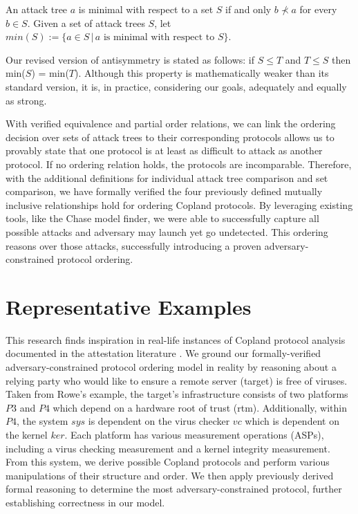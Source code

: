 \documentclass[runningheads]{llncs}
\theoremstyle{definition}
\begin{document}
\begin{definition}
  An attack tree $a$ is minimal with respect to a set $S$ if and only $b \nprec a$ for every $b \in S$. Given a set of attack trees $S$, let $min(S) := \{a \in S \,|\, a \text{ is minimal with respect to } S \}$.
\end{definition}

Our revised version of antisymmetry is stated as follows: if $S \le T$ and $T \le S$ then min($S$) = min($T$). Although this property is mathematically weaker than its standard version, it is, in practice, considering our goals, adequately and equally as strong.


With verified equivalence and partial order relations, we can link the ordering decision over sets of attack trees to their corresponding protocols allows us to provably state that one protocol is at least as difficult to attack as another protocol. If no ordering relation holds, the protocols are incomparable. Therefore, with the additional definitions for individual attack tree comparison and set comparison, we have formally verified the four previously defined mutually inclusive relationships hold for ordering Copland protocols. By leveraging existing tools, like the Chase model finder, we were able to successfully capture all possible attacks and adversary may launch yet go undetected. This ordering reasons over those attacks, successfully introducing a proven adversary-constrained protocol ordering. 


\section{Representative Examples}

This research finds inspiration in real-life instances of Copland protocol analysis documented in the attestation literature \cite{Rowe:2021:OnOrdering,Coker::Principles-of-R}. We ground our formally-verified adversary-constrained protocol ordering model in reality by reasoning about a relying party who would like to ensure a remote server (target) is free of viruses. Taken from Rowe's \cite{Rowe:2016:Confining} example, the target's infrastructure consists of two platforms $P3$ and $P4$ which depend on a hardware root of trust (rtm). Additionally, within $P4$, the system $sys$ is dependent on the virus checker $vc$ which is dependent on the kernel $ker$.  Each platform has various measurement operations (ASPs), including a virus checking measurement and a kernel integrity measurement. From this system, we derive possible Copland protocols and perform various manipulations of their structure and order. We then apply previously derived formal reasoning to determine the most adversary-constrained protocol, further establishing correctness in our model.
\end{document}
